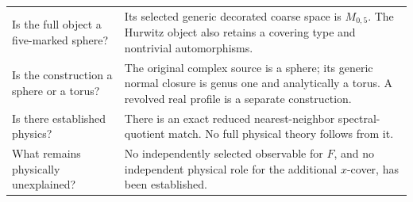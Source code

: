\begin{longtable}{L{51mm}L{101mm}}
Is the full object a five-marked sphere? & Its selected generic decorated coarse space is \(M_{0,5}\). The Hurwitz object also retains a covering type and nontrivial automorphisms.\\
Is the construction a sphere or a torus? & The original complex source is a sphere; its generic normal closure is genus one and analytically a torus. A revolved real profile is a separate construction.\\
Is there established physics? & There is an exact reduced nearest-neighbor spectral-quotient match. No full physical theory follows from it.\\
What remains physically unexplained? & No independently selected observable for \(F\), and no independent physical role for the additional \(x\)-cover, has been established.\\
\bottomrule
\end{longtable}
